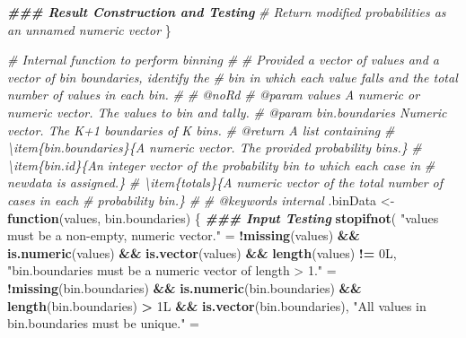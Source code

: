 \documentclass[
]{book}
\newenvironment{Shaded}{\begin{snugshade}}{\end{snugshade}}
\newcommand{\CommentTok}[1]{\textcolor[rgb]{0.56,0.35,0.01}{\textit{#1}}}
\newcommand{\ControlFlowTok}[1]{\textcolor[rgb]{0.13,0.29,0.53}{\textbf{#1}}}
\newcommand{\DocumentationTok}[1]{\textcolor[rgb]{0.56,0.35,0.01}{\textbf{\textit{#1}}}}
\newcommand{\FunctionTok}[1]{\textcolor[rgb]{0.13,0.29,0.53}{\textbf{#1}}}
\newcommand{\NormalTok}[1]{#1}
\newcommand{\OtherTok}[1]{\textcolor[rgb]{0.56,0.35,0.01}{#1}}
\newcommand{\SpecialCharTok}[1]{\textcolor[rgb]{0.81,0.36,0.00}{\textbf{#1}}}
\newcommand{\StringTok}[1]{\textcolor[rgb]{0.31,0.60,0.02}{#1}}
\begin{document}
\begin{Shaded}
\begin{Highlighting}[]
  \DocumentationTok{\#\#\# Result Construction and Testing}
  \CommentTok{\# Return modified probabilities as an unnamed numeric vector}
\NormalTok{\}}

\CommentTok{\#\textquotesingle{} Internal function to perform binning}
\CommentTok{\#\textquotesingle{} }
\CommentTok{\#\textquotesingle{} Provided a vector of values and a vector of bin boundaries, identify the }
\CommentTok{\#\textquotesingle{}   bin in which each value falls and the total number of values in each bin.}
\CommentTok{\#\textquotesingle{}}
\CommentTok{\#\textquotesingle{} @noRd}
\CommentTok{\#\textquotesingle{} @param values A numeric or numeric vector. The values to bin and tally.}
\CommentTok{\#\textquotesingle{} @param bin.boundaries Numeric vector. The K+1 boundaries of K bins.}
\CommentTok{\#\textquotesingle{} @return A list containing}
\CommentTok{\#\textquotesingle{} \textbackslash{}item\{bin.boundaries\}\{A numeric vector. The provided probability bins.\}}
\CommentTok{\#\textquotesingle{} \textbackslash{}item\{bin.id\}\{An integer vector of the probability bin to which each case in }
\CommentTok{\#\textquotesingle{}   \textasciigrave{}newdata\textasciigrave{} is assigned.\}}
\CommentTok{\#\textquotesingle{} \textbackslash{}item\{totals\}\{A numeric vector of the total number of cases in each }
\CommentTok{\#\textquotesingle{}   probability bin.\}}
\CommentTok{\#\textquotesingle{}   }
\CommentTok{\#\textquotesingle{} @keywords internal}
\NormalTok{.binData }\OtherTok{\textless{}{-}} \ControlFlowTok{function}\NormalTok{(values, bin.boundaries) \{}
  \DocumentationTok{\#\#\# Input Testing}
  \FunctionTok{stopifnot}\NormalTok{(}
    \StringTok{"\textasciigrave{}values\textasciigrave{} must be a non{-}empty, numeric vector."} \OtherTok{=} 
      \SpecialCharTok{!}\FunctionTok{missing}\NormalTok{(values) }\SpecialCharTok{\&\&} \FunctionTok{is.numeric}\NormalTok{(values) }\SpecialCharTok{\&\&} \FunctionTok{is.vector}\NormalTok{(values) }\SpecialCharTok{\&\&}
        \FunctionTok{length}\NormalTok{(values) }\SpecialCharTok{!=}\NormalTok{ 0L,}
    \StringTok{"\textasciigrave{}bin.boundaries\textasciigrave{} must be a numeric vector of length \textgreater{} 1."} \OtherTok{=} 
      \SpecialCharTok{!}\FunctionTok{missing}\NormalTok{(bin.boundaries) }\SpecialCharTok{\&\&} \FunctionTok{is.numeric}\NormalTok{(bin.boundaries) }\SpecialCharTok{\&\&} 
      \FunctionTok{length}\NormalTok{(bin.boundaries) }\SpecialCharTok{\textgreater{}}\NormalTok{ 1L }\SpecialCharTok{\&\&} \FunctionTok{is.vector}\NormalTok{(bin.boundaries),}
    \StringTok{"All values in \textasciigrave{}bin.boundaries\textasciigrave{} must be unique."} \OtherTok{=} 

\end{Highlighting}
\end{Shaded}
\end{document}

